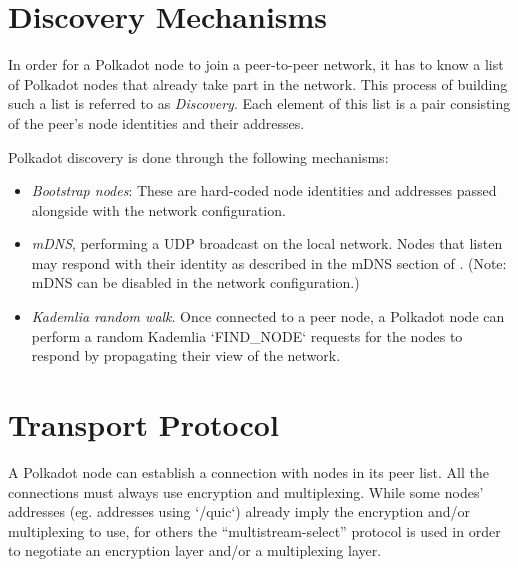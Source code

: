 \documentclass{book}
\newcommand{\tmem}[1]{{\em #1\/}}
\newcommand{\tmtextit}[1]{{\itshape{#1}}}
\providecommand{\tmem}[1]{\tmtextit{#1}}
\providecommand{\tmtextit}[1]{\tmtextit{#1}}
\begin{document}
{}

\section{Discovery Mechanisms}

In order for a Polkadot node to join a peer-to-peer network, it has to know a
list of Polkadot nodes that already take part in the network. This process of
building such a list is referred to as {\tmem{Discovery}}. Each element of
this list is a pair consisting of the peer's node identities and their
addresses.

{}

Polkadot discovery is done through the following mechanisms:
\begin{itemize}
  \item {\tmem{Bootstrap nodes}}: These are hard-coded node identities and
  addresses passed alongside with the network configuration.
  
  \item {\tmem{mDNS}}, performing a UDP broadcast on the local network. Nodes
  that listen may respond with their identity as described in the mDNS section
  of {\cite{protocol_labs_libp2p_2019}}. (Note: mDNS can be disabled in the
  network configuration.)
  
  \item {\tmem{Kademlia random walk}}. Once connected to a peer node, a
  Polkadot node can perform a random Kademlia `FIND\_NODE` requests for the
  nodes {} to respond by propagating their view of the
  network.
\end{itemize}
\section{Transport Protocol}\label{sect_transport_protocol}

A Polkadot node can establish a connection with nodes in its peer list. All
the connections must always use encryption and multiplexing. While some nodes'
addresses (eg. addresses using `/quic`) already imply the encryption and/or
multiplexing to use, for others the ``multistream-select'' protocol is used in
order to negotiate an encryption layer and/or a multiplexing layer.
\end{document}
